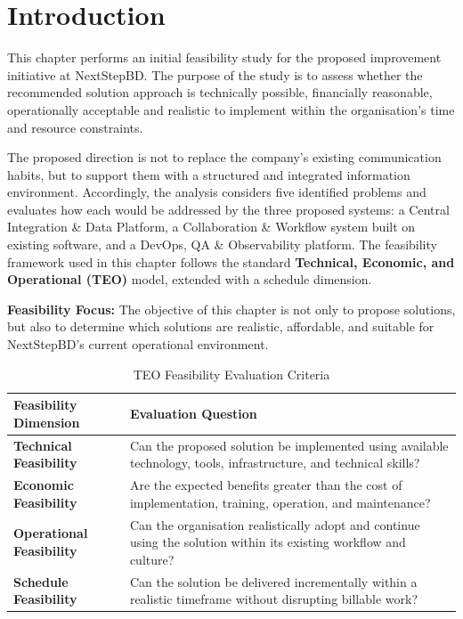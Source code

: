 \documentclass[12pt,a4paper]{report}
\begin{document}
\section{Introduction}
This chapter performs an initial feasibility study for the proposed improvement initiative at NextStepBD. The purpose of the study is to assess whether the recommended solution approach is technically possible, financially reasonable, operationally acceptable and realistic to implement within the organisation's time and resource constraints.

The proposed direction is not to replace the company's existing communication habits, but to support them with a structured and integrated information environment. Accordingly, the analysis considers five identified problems and evaluates how each would be addressed by the three proposed systems: a Central Integration \& Data Platform, a Collaboration \& Workflow system built on existing software, and a DevOps, QA \& Observability platform. The feasibility framework used in this chapter follows the standard \textbf{Technical, Economic, and Operational (TEO)} model, extended with a schedule dimension.

\begin{noteBox}
\textbf{Feasibility Focus:} The objective of this chapter is not only to propose solutions, but also to determine which solutions are realistic, affordable, and suitable for NextStepBD's current operational environment.
\end{noteBox}

\begin{table}[H]
\centering
\renewcommand{\arraystretch}{1.3}
\begin{tabularx}{\textwidth}{|p{4cm}|X|}
\hline
\rowcolor{secondary}
\textbf{Feasibility Dimension} & \textbf{Evaluation Question} \\
\hline
\textbf{Technical Feasibility} & Can the proposed solution be implemented using available technology, tools, infrastructure, and technical skills? \\
\hline
\textbf{Economic Feasibility} & Are the expected benefits greater than the cost of implementation, training, operation, and maintenance? \\
\hline
\textbf{Operational Feasibility} & Can the organisation realistically adopt and continue using the solution within its existing workflow and culture? \\
\hline
\textbf{Schedule Feasibility} & Can the solution be delivered incrementally within a realistic timeframe without disrupting billable work? \\
\hline
\end{tabularx}
\caption{TEO Feasibility Evaluation Criteria}
\end{table}
\end{document}
